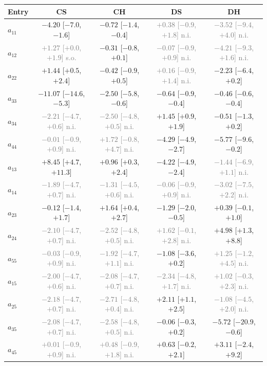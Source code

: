 \begin{tabular}{lcccc}\toprule
Entry & CS & CH & DS & DH\\
\midrule
$a_{11}$ & $-4.20$ [$-7.0$, $-1.6$] & $-0.72$ [$-1.4$, $-0.4$] & \textcolor{gray}{$+0.38$ [$-0.9$, $+1.8$] n.i.} & \textcolor{gray}{$-3.52$ [$-9.4$, $+4.0$] n.i.}\\
$a_{12}$ & \textcolor{gray}{$+1.27$ [$+0.0$, $+1.9$] s.o.} & $-0.31$ [$-0.8$, $+0.1$] & \textcolor{gray}{$-0.07$ [$-0.9$, $+0.9$] n.i.} & \textcolor{gray}{$-4.21$ [$-9.3$, $+1.6$] n.i.}\\
$a_{22}$ & $+1.44$ [$+0.5$, $+2.4$] & $-0.42$ [$-0.9$, $+0.5$] & \textcolor{gray}{$+0.16$ [$-0.9$, $+1.4$] n.i.} & $-2.23$ [$-6.4$, $+0.2$]\\
$a_{33}$ & $-11.07$ [$-14.6$, $-5.3$] & $-2.50$ [$-5.8$, $-0.6$] & $-0.64$ [$-0.9$, $-0.4$] & $-0.46$ [$-0.6$, $-0.4$]\\
$a_{34}$ & \textcolor{gray}{$-2.21$ [$-4.7$, $+0.6$] n.i.} & \textcolor{gray}{$-2.50$ [$-4.8$, $+0.5$] n.i.} & $+1.45$ [$+0.9$, $+1.9$] & $-0.51$ [$-1.3$, $+0.2$]\\
$a_{44}$ & \textcolor{gray}{$-0.01$ [$-0.9$, $+0.9$] n.i.} & \textcolor{gray}{$+1.72$ [$-0.8$, $+4.7$] n.i.} & $-4.29$ [$-4.9$, $-2.7$] & $-5.77$ [$-9.6$, $-0.2$]\\
$a_{13}$ & $+8.45$ [$+4.7$, $+11.3$] & $+0.96$ [$+0.3$, $+2.4$] & $-4.22$ [$-4.9$, $-2.4$] & \textcolor{gray}{$-1.44$ [$-6.9$, $+1.1$] n.i.}\\
$a_{14}$ & \textcolor{gray}{$-1.89$ [$-4.7$, $+0.7$] n.i.} & \textcolor{gray}{$-1.31$ [$-4.5$, $+0.6$] n.i.} & \textcolor{gray}{$-0.06$ [$-0.9$, $+0.9$] n.i.} & \textcolor{gray}{$-3.02$ [$-7.5$, $+2.2$] n.i.}\\
$a_{23}$ & $-0.12$ [$-1.4$, $+1.7$] & $+1.64$ [$+0.4$, $+2.7$] & $-1.29$ [$-2.0$, $-0.5$] & $+0.39$ [$-0.1$, $+1.0$]\\
$a_{24}$ & \textcolor{gray}{$-2.10$ [$-4.7$, $+0.7$] n.i.} & \textcolor{gray}{$-2.52$ [$-4.8$, $+0.5$] n.i.} & \textcolor{gray}{$+1.62$ [$-0.1$, $+2.8$] n.i.} & $+4.98$ [$+1.3$, $+8.8$]\\
$a_{55}$ & \textcolor{gray}{$-0.03$ [$-0.9$, $+0.9$] n.i.} & \textcolor{gray}{$-1.92$ [$-4.7$, $+1.1$] n.i.} & $-1.08$ [$-3.6$, $+0.2$] & \textcolor{gray}{$+1.25$ [$-1.2$, $+4.5$] n.i.}\\
$a_{15}$ & \textcolor{gray}{$-2.00$ [$-4.7$, $+0.6$] n.i.} & \textcolor{gray}{$-2.08$ [$-4.7$, $+0.7$] n.i.} & \textcolor{gray}{$-2.34$ [$-4.8$, $+1.7$] n.i.} & \textcolor{gray}{$+1.02$ [$-0.3$, $+2.3$] n.i.}\\
$a_{25}$ & \textcolor{gray}{$-2.18$ [$-4.7$, $+0.7$] n.i.} & \textcolor{gray}{$-2.71$ [$-4.8$, $+0.4$] n.i.} & $+2.11$ [$+1.1$, $+2.5$] & \textcolor{gray}{$-1.08$ [$-4.5$, $+2.0$] n.i.}\\
$a_{35}$ & \textcolor{gray}{$-2.08$ [$-4.7$, $+0.7$] n.i.} & \textcolor{gray}{$-2.58$ [$-4.8$, $+0.5$] n.i.} & $-0.06$ [$-0.3$, $+0.2$] & $-5.72$ [$-20.9$, $-0.6$]\\
$a_{45}$ & \textcolor{gray}{$+0.01$ [$-0.9$, $+0.9$] n.i.} & \textcolor{gray}{$+0.48$ [$-0.9$, $+1.8$] n.i.} & $+0.63$ [$-0.2$, $+2.1$] & $+3.11$ [$-2.4$, $+9.2$]\\
\bottomrule\end{tabular}
